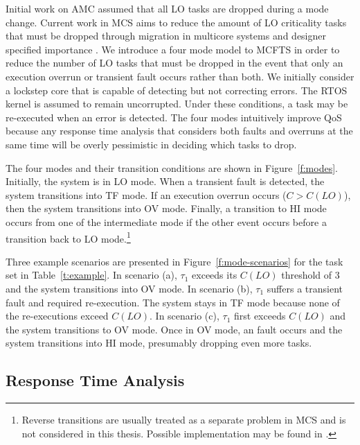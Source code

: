 	Initial work on AMC assumed that all LO tasks are dropped during a mode change. 
	Current work in MCS aims to reduce the amount of LO criticality tasks that must be dropped through migration in multicore systems \cite{al2015enhanced} and designer specified importance \cite{fleming2014incorporating}. 
	We introduce a four mode model to MCFTS in order to reduce the number of LO tasks that must be dropped in the event that only an execution overrun or transient fault occurs rather than both. 
	We initially consider a lockstep core that is capable of detecting but not correcting errors.
	The RTOS kernel is assumed to remain uncorrupted.
	Under these conditions, a task may be re-executed when an error is detected.
		The four modes intuitively improve QoS because any response time analysis that considers both faults and overruns at the same time will be overly pessimistic in deciding which tasks to drop.
	
	The four modes and their transition conditions are shown in Figure~\ref{f:modes}. 
	Initially, the system is in LO mode. 
	When a transient fault is detected, the system transitions into TF mode. 
	If an execution overrun occurs ($C>C(LO)$), then the system transitions into OV mode. 
	Finally, a transition to HI mode occurs from one of the intermediate mode if the other event occurs before a transition back to LO mode.\footnote{Reverse transitions are usually treated as a separate problem in MCS and is not considered in this thesis. Possible implementation may be found in \cite{bate2015bailout}.}
	
	Three example scenarios are presented in Figure~\ref{f:mode-scenarios} for the task set in Table~\ref{t:example}. 
	In scenario (a), $\tau_1$ exceeds its $C(LO)$ threshold of 3 and the system transitions into OV mode. In scenario (b), $\tau_1$ suffers a transient fault and required re-execution. The system stays in TF mode because none of the re-executions exceed $C(LO)$. In scenario (c), $\tau_1$ first exceeds $C(LO)$ and the system transitions to OV mode. Once in OV mode, an fault occurs and the system transitions into HI mode, presumably dropping even more tasks.
	

	
	
\subsection{Response Time Analysis}
	
